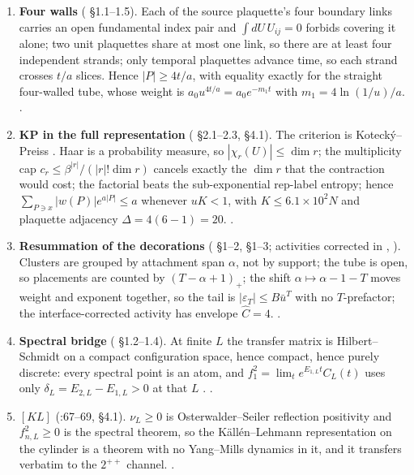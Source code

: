 \begin{enumerate}[label=\textbf{R\arabic*.},leftmargin=2.7em]
\item \textbf{Four walls} ( \S1.1--1.5). Each of the source
      plaquette's four boundary links carries an open fundamental index pair and $\int dU\,U_{ij}=0$
      forbids covering it alone; two unit plaquettes share at most one link, so there are at least
      four independent strands; only temporal plaquettes advance time, so each strand crosses $t/a$
      slices. Hence $|P|\ge4t/a$, with equality exactly for the straight four-walled tube, whose
      weight is $a_0u^{4t/a}=a_0e^{-m_1t}$ with $m_1=4\ln(1/u)/a$. \LT.
\item \textbf{KP in the full representation} ( \S2.1--2.3, \S4.1). The
      criterion is Koteck\'y--Preiss \cite{kp}. Haar is a
      probability measure, so $|\chi_r(U)|\le\dim r$; the multiplicity cap
      $c_r\le\beta^{|r|}/(|r|!\dim r)$ cancels exactly the $\dim r$ that the contraction would cost;
      the factorial beats the sub-exponential rep-label entropy; hence $\sum_{P\ni x}|w(P)|e^{a|P|}
      \le a$ whenever $uK<1$, with $K\le6.1\times10^2N$ and plaquette adjacency
      $\Delta=4(6-1)=20$. \LT.
\item \textbf{Resummation of the decorations} ( \S1--2, 
      \S1--3; activities corrected in , ). Clusters are
      grouped by attachment span $\alpha$, not by support; the tube is open, so placements are
      counted by $(T-\alpha+1)_+$; the shift $\alpha\mapsto\alpha-1-T$ moves weight and exponent
      together, so the tail is $|\varepsilon_T|\le B\bar u^T$ with no $T$-prefactor; the
      interface-corrected activity has envelope $\hat C=4$. \LT.
\item \textbf{Spectral bridge} ( \S1.2--1.4). At finite $L$ the
      transfer matrix is Hilbert--Schmidt on a compact configuration space, hence compact, hence
      purely discrete: every spectral point is an atom, and $f_1^2=\lim_te^{E_{1,L}t}C_L(t)$ uses
      only $\delta_L=E_{2,L}-E_{1,L}>0$ at that $L$ \cite{reed-simon}. \LT.
\item \textbf{$[KL]$} (:67--69,  \S4.1).
      $\nu_L\ge0$ is Osterwalder--Seiler reflection positivity \cite{osterwalder-seiler,os1973} and
      $f_{n,L}^2\ge0$ is the spectral theorem, so the K\"all\'en--Lehmann representation \cite{kl} on
      the cylinder is a theorem with no Yang--Mills dynamics in it, and it transfers verbatim to the
      $2^{++}$ channel. \LT.
\end{enumerate}

